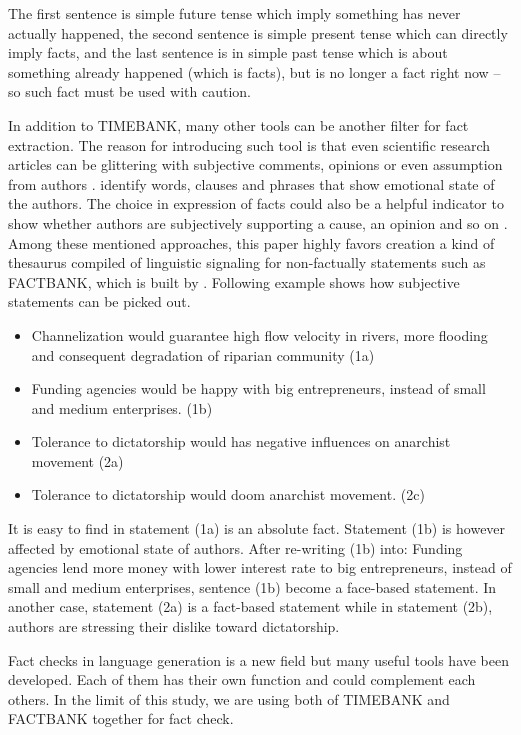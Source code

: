 The first sentence is simple future tense which imply something has never actually happened, the second sentence is simple present tense which can directly imply facts, and the last sentence is in simple past tense which is about something already happened (which is facts), but is no longer a fact right now -- so such fact must be used with caution. 

In addition to TIMEBANK, many other tools can be another filter for fact extraction. The reason for introducing such tool is that even scientific research articles can be glittering with subjective comments, opinions or even assumption from authors \cite{schultze2000confessional}. \cite{dave2003mining} identify words, clauses and phrases that show emotional state of the authors. The choice in expression of facts could also be a helpful indicator to show whether authors are subjectively supporting a cause, an opinion and so on \cite{wiebe2005annotating}. Among these mentioned approaches, this paper highly favors creation a kind of thesaurus compiled of linguistic signaling for non-factually statements such as FACTBANK, which is built by \cite{sauri2009factbank}. Following example shows how subjective statements can be picked out.

\begin{itemize}
	\item Channelization would guarantee high flow velocity in rivers, more flooding and consequent degradation of riparian community (1a)
	\item Funding agencies would be happy with big entrepreneurs, instead of small and medium enterprises. (1b)
	\item Tolerance to dictatorship would has negative influences on anarchist movement (2a)
	\item Tolerance to dictatorship would doom anarchist movement. (2c)
\end{itemize}

It is easy to find in statement (1a) is an absolute fact. Statement (1b) is however affected by emotional state of authors. After re-writing (1b) into: Funding agencies lend more money with lower interest rate to big entrepreneurs, instead of small and medium enterprises, sentence (1b) become a face-based statement. In another case, statement (2a) is a fact-based statement while in statement (2b), authors are stressing their dislike toward dictatorship.

Fact checks in language generation is a new field but many useful tools have been developed. Each of them has their own function and could complement each others. In the limit of this study, we are using both of TIMEBANK and FACTBANK together for fact check.

